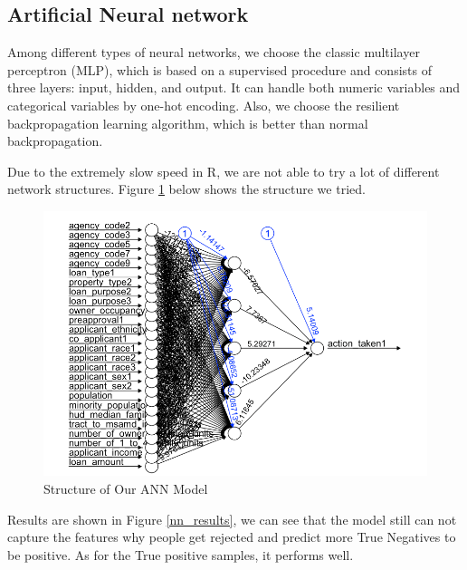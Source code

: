 \documentclass{jpp}
\begin{document}
\subsection{Artificial Neural network}

Among different types of neural networks, we choose the classic multilayer perceptron (MLP), which is based on a supervised procedure and consists of three layers: input, hidden, and output. It can handle both numeric variables and categorical variables by one-hot encoding. Also, we choose the resilient backpropagation learning algorithm, which is better than normal backpropagation. 

Due to the extremely slow speed in R, we are not able to try a lot of different network structures. Figure \ref{nn_structure} below shows the structure we tried. 

\begin{figure}
  \centering
  \includegraphics[width=.9\linewidth]{nn_structure.png}  
  \caption{Structure of Our ANN Model}
\label{nn_structure}
\end{figure}

Results are shown in Figure \ref{nn_results}, we can see that the model still can not capture the features why people get rejected and predict more True Negatives to be positive. As for the True positive samples, it performs well. 
\end{document}

